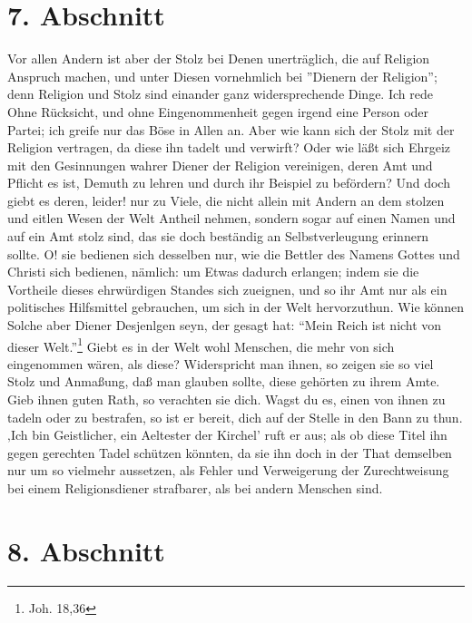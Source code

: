 \section{7. Abschnitt}

Vor allen Andern ist aber der Stolz bei Denen unerträglich, die auf Religion Anspruch machen, und unter Diesen vornehmlich bei ''Dienern der Religion''; denn Religion und Stolz sind einander ganz widersprechende Dinge. Ich rede Ohne Rücksicht, und ohne Eingenommenheit gegen irgend eine Person oder Partei; ich greife nur das Böse in Allen an. Aber wie kann sich der Stolz mit der Religion vertragen, da diese ihn tadelt und verwirft? Oder wie läßt sich Ehrgeiz mit den Gesinnungen wahrer Diener der Religion vereinigen, deren Amt und Pflicht es ist, Demuth zu lehren und durch ihr Beispiel zu befördern? Und doch giebt es deren, leider! nur zu Viele, die nicht allein mit Andern an dem stolzen und eitlen Wesen der Welt Antheil nehmen, sondern sogar auf einen Namen und auf ein Amt stolz sind, das sie doch beständig an Selbstverleugung erinnern sollte. O! sie bedienen sich desselben nur, wie die Bettler des Namens Gottes und Christi sich bedienen, nämlich: um Etwas dadurch erlangen; indem sie die Vortheile dieses ehrwürdigen Standes sich zueignen, und so ihr Amt nur als ein politisches Hilfsmittel gebrauchen, um sich in der Welt hervorzuthun. Wie können Solche aber Diener Desjenlgen seyn, der gesagt hat: "`Mein Reich ist nicht von dieser Welt."'\footnote{Joh. 18,36} Giebt es in der Welt wohl Menschen, die mehr von sich eingenommen wären, als diese? Widerspricht man ihnen, so zeigen sie so viel Stolz und Anmaßung, daß man glauben sollte, diese gehörten zu ihrem Amte. Gieb ihnen guten Rath, so verachten sie dich. Wagst du es, einen von ihnen zu tadeln oder zu bestrafen, so ist er bereit, dich auf der Stelle in den Bann zu thun. ‚Ich bin Geistlicher, ein Aeltester der Kirchel’ ruft er aus; als ob diese Titel ihn gegen gerechten Tadel schützen könnten, da sie ihn doch in der That demselben nur um so vielmehr aussetzen, als Fehler und Verweigerung der Zurechtweisung bei einem Religionsdiener strafbarer, als bei andern Menschen sind.

\section{8. Abschnitt}

